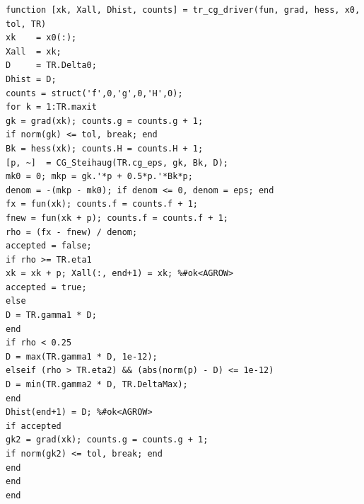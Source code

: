 \documentclass[11pt]{article}
\begin{document}
\begin{lstlisting}[style=matlabstyle,caption={Main Script},label={main}]
function [xk, Xall, Dhist, counts] = tr_cg_driver(fun, grad, hess, x0, tol, TR)
xk    = x0(:);
Xall  = xk;
D     = TR.Delta0;
Dhist = D;
counts = struct('f',0,'g',0,'H',0);
for k = 1:TR.maxit
gk = grad(xk); counts.g = counts.g + 1;
if norm(gk) <= tol, break; end
Bk = hess(xk); counts.H = counts.H + 1;
[p, ~]  = CG_Steihaug(TR.cg_eps, gk, Bk, D);
mk0 = 0; mkp = gk.'*p + 0.5*p.'*Bk*p;
denom = -(mkp - mk0); if denom <= 0, denom = eps; end
fx = fun(xk); counts.f = counts.f + 1;
fnew = fun(xk + p); counts.f = counts.f + 1;
rho = (fx - fnew) / denom;
accepted = false;
if rho >= TR.eta1
xk = xk + p; Xall(:, end+1) = xk; %#ok<AGROW>
accepted = true;
else
D = TR.gamma1 * D;
end
if rho < 0.25
D = max(TR.gamma1 * D, 1e-12);
elseif (rho > TR.eta2) && (abs(norm(p) - D) <= 1e-12)
D = min(TR.gamma2 * D, TR.DeltaMax);
end
Dhist(end+1) = D; %#ok<AGROW>
if accepted
gk2 = grad(xk); counts.g = counts.g + 1;
if norm(gk2) <= tol, break; end
end
end
end
\end{lstlisting}			
\end{document}
